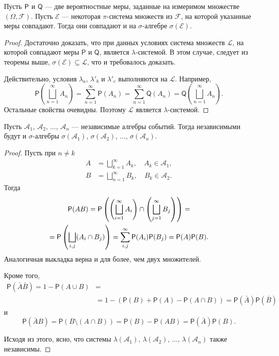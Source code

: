 \begin{lemma}
  Пусть $ \mathsf P $ и $ \mathsf Q $ --- две вероятностные меры, заданные на
  измеримом множестве $ (\Omega, \mathscr F) $. Пусть $ \mathscr E $ ---
  некоторая $ \pi $-система множеств из $ \mathscr F $, на которой указанные
  меры совпадают. Тогда они совпадают и на $ \sigma $-алгебре $ \sigma(\mathscr
  E)$.
\end{lemma}
\begin{proof}
  Достаточно доказать, что при данных условиях система множеств $ \mathscr L $, на которой
  совпадают меры $ \mathsf P $ и $ \mathsf Q $, является $ \lambda
  $-системой. В этом случае,
  следует из теоремы выше, $ \sigma(\mathscr E) \subseteq \mathscr L $, что и
  требовалось доказать.

  Действительно, условия $ \lambda_a $, $ \lambda'_b $ и $ \lambda'_c $
  выполняются на $ \mathscr L $. Например, 
  \[
    \mathsf P\left(\bigsqcup_{n=1}^\infty A_n\right) = \sum_{n=1}^\infty \mathsf P(A_n) =
    \sum_{n=1}^\infty \mathsf Q(A_n) = \mathsf Q\left(\bigsqcup_{n=1}^\infty A_n\right).
  \]
  Остальные свойства очевидны. Поэтому $ \mathscr L $ является $ \lambda
  $-системой.
\end{proof}

\begin{lemma}
  Пусть $ \mathscr A_1,\, \mathscr A_2,\, \ldots,\, \mathscr A_n $ --- независимые
  алгебры событий. Тогда независимыми будут и $ \sigma $-алгебры $ \sigma(\mathscr
  A_1)$, $ \sigma(\mathscr A_2) $, $ \ldots $, $ \sigma(\mathscr A_n) $.
\end{lemma}
\begin{proof}
  Пусть при $ n \neq k $
  \begin{align*}
    A &= \bigsqcup_{k=1}^\infty A_k, \quad A_k \in \mathscr A_1,\\
    B &= \bigsqcup_{n=1}^\infty B_k, \quad B_k \in \mathscr A_2.
  \end{align*}
  Тогда
  \begin{multline*}
    \mathsf P(AB) = \mathsf P \left( \left(\bigsqcup_{i=1}^\infty
      A_i\right) \cap \left( \bigsqcup_{j=1}^\infty B_j \right) 
    \right) =\\= \mathsf P \left( \bigsqcup_{i, j} (A_i \cap B_j) \right) =
    \sum_{i, j}^\infty \mathsf P(A_i)\mathsf P(B_j) =
    \mathsf P(A) \mathsf P(B).
  \end{multline*}
  Аналогичная выкладка верна и для более, чем двух множителей.

Кроме того, 
\begin{align*}
  \mathsf P(\bar A \bar B) = 1 - \mathsf P(A \cup B) &=\\&=
    1 - \left( \mathsf P(B)
    + \mathsf P(A) - \mathsf P(A\cap B)\right)  = \mathsf P(\bar A)
    \mathsf P(\bar B)
\end{align*}
и 
\[
    \mathsf P(\bar A B) = \mathsf P(B\setminus (A\cap B)) =\mathsf P(B) -
    \mathsf P(AB) = \mathsf P(\bar A)\mathsf P(B).
\]

Исходя из этого, ясно, что системы $ \lambda(\mathscr A_1),\,
\lambda(\mathscr A_2),\, \ldots,\, \lambda(\mathscr A_n) $ также независимы.
\end{proof} %

